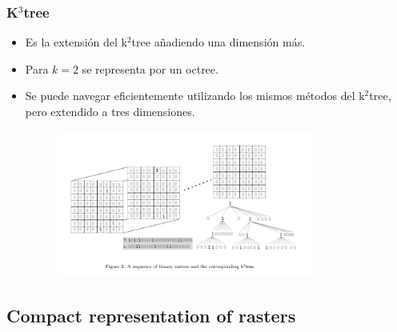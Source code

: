 \documentclass{article}
\begin{document}
\subsubsection*{K$^3$tree}
\begin{itemize}
  \item Es la extensión del k$^2$tree añadiendo una dimensión más.
  \item Para $k = 2$ se representa por un octree.
  \item Se puede navegar eficientemente utilizando los mismos métodos del
    k$^2 $tree, pero extendido a tres dimensiones.
\begin{figure}[h]
  \centering
  \includegraphics[width=0.8\textwidth]{../images/k3tree.png}
\end{figure}
\end{itemize}


\subsection*{Compact representation of rasters}
\end{document}
